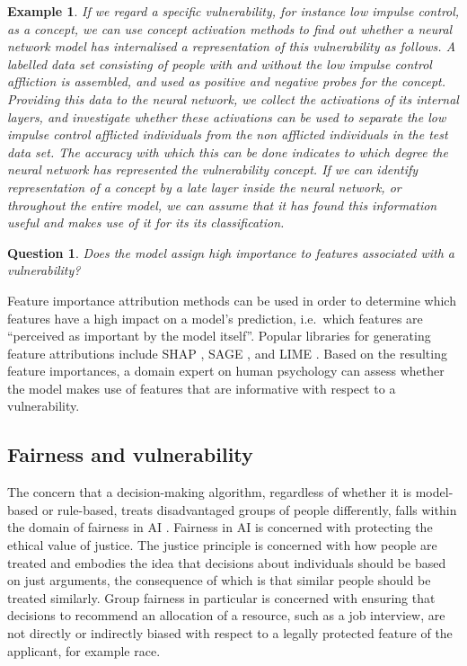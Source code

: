 \documentclass[11pt,theapa]{article}
\theoremstyle{plain}
\newtheorem{question}{Question}
\newtheorem{case}{Example}
\newcommand{\vulnerability}{{low impulse control}} %
\begin{document}
\begin{case}
If we regard a specific vulnerability, for instance \vulnerability{}, as a concept, we can use concept activation methods to find out whether a neural network model has internalised a representation of this vulnerability as follows.
A labelled data set consisting of people with and without the \vulnerability{} affliction is assembled, and used as positive and negative probes for the concept. Providing this data to the neural network, we collect the activations of its internal layers, and investigate whether these activations can be used to separate the \vulnerability{} afflicted individuals from the non afflicted individuals in the test data set. 
The accuracy with which this can be done indicates to which degree the neural network has represented the vulnerability concept. If we can identify representation of a concept by a late layer inside the neural network, or throughout the entire model, we can assume that it has found this information useful and  makes use of it for its  its classification.
\end{case}

\begin{question}
    Does the model assign high importance to features associated with a vulnerability?
\end{question}

Feature importance attribution methods can be used in order to determine which features have a high impact on a model's prediction, i.e.\ which features are ``perceived as important by the model itself''. Popular libraries for generating feature attributions include SHAP \cite{Lundberg2017AUA}, SAGE \cite{covert_sage}, and LIME \cite{lime}. Based on the resulting feature importances, a domain expert on human psychology can assess whether the model makes use of features that are informative with respect to a vulnerability. 

\subsection{Fairness and vulnerability}
The concern that a decision-making algorithm, regardless of whether it is model-based or rule-based, treats disadvantaged groups of people differently, falls within the domain of fairness in AI \cite{barocas-hardt-narayanan}. 
Fairness in AI is concerned with protecting the ethical value of justice. The justice principle is concerned with how people are treated and embodies the idea that decisions about individuals should be based on just arguments, the consequence of which is that similar people should be treated similarly. Group fairness in particular is concerned with ensuring that decisions to recommend an allocation of a resource, such as a job interview, are not directly or indirectly biased with respect to a legally protected feature of the applicant, for example race. 
\end{document}
